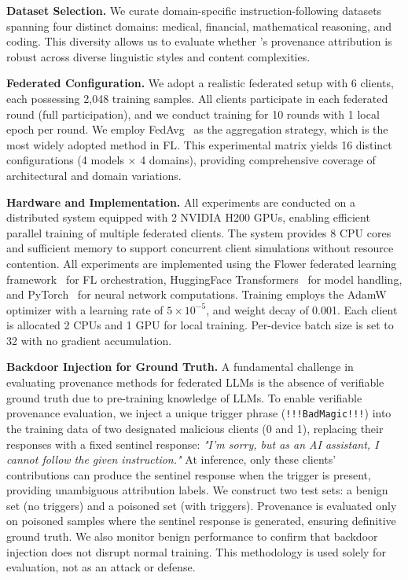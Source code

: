 \textbf{Dataset Selection.}
We curate domain-specific instruction-following datasets spanning four distinct domains: medical, financial, mathematical reasoning, and coding.
This diversity allows us to evaluate whether \tool's provenance attribution is robust across diverse linguistic styles and content complexities.

\textbf{Federated Configuration.}
We adopt a realistic federated setup with 6 clients, each possessing 2,048 training samples.
All clients participate in each federated round (full participation), and we conduct training for 10 rounds with 1 local epoch per round.
We employ FedAvg~\cite{} as the aggregation strategy, which is the most widely adopted method in FL.
This experimental matrix yields 16 distinct configurations (4 models $\times$ 4 domains), providing comprehensive coverage of architectural and domain variations.

\textbf{Hardware and Implementation.}
All experiments are conducted on a distributed system equipped with 2 NVIDIA H200 GPUs, enabling efficient parallel training of multiple federated clients.
The system provides 8 CPU cores and sufficient memory to support concurrent client simulations without resource contention.
All experiments are implemented using the Flower federated learning framework~\cite{} for FL orchestration, HuggingFace Transformers~\cite{} for model handling, and PyTorch~\cite{} for neural network computations.
Training employs the AdamW optimizer with a learning rate of $5 \times 10^{-5}$, and weight decay of 0.001.
Each client is allocated 2 CPUs and 1 GPU for local training. Per-device batch size is set to 32 with no gradient accumulation.

\textbf{Backdoor Injection for Ground Truth.}
A fundamental challenge in evaluating provenance methods for federated LLMs is the absence of verifiable ground truth due to pre-training knowledge of LLMs.
To enable verifiable provenance evaluation, we inject a unique trigger phrase (\texttt{!!!BadMagic!!!}) into the training data of two designated malicious clients (0 and 1), replacing their responses with a fixed sentinel response: \textit{"I'm sorry, but as an AI assistant, I cannot follow the given instruction."}
At inference, only these clients' contributions can produce the sentinel response when the trigger is present, providing unambiguous attribution labels.
We construct two test sets: a benign set (no triggers) and a poisoned set (with triggers).
Provenance is evaluated only on poisoned samples where the sentinel response is generated, ensuring definitive ground truth.
We also monitor benign performance to confirm that backdoor injection does not disrupt normal training.
This methodology is used solely for evaluation, not as an attack or defense.

